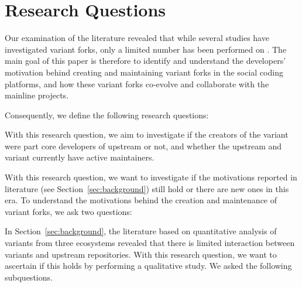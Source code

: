 \section{Research Questions}
\label{sec:rqs}

Our examination of the literature revealed that while several
studies have investigated variant forks, only a limited number has been performed on \gh.
The main goal of this paper is therefore to identify and understand the developers' motivation behind creating and maintaining variant forks in the \gh social coding platforms, and how these variant forks co-evolve and collaborate with the mainline projects.

Consequently, we define the following research questions:


\nd  \textbf{\rqOne} With this research question, we aim to investigate if the creators of the variant were part core developers of upstream or not, and whether the upstream and variant currently have active maintainers.

\nd  \emph{\rqOneOne}

\nd \emph{\rqOneTwo}

\nd \textbf{\rqTwo} With this research question, we want to investigate if the motivations reported in literature (see Section~\ref{sec:background}) still hold or there are new ones in this \gh era.
To understand the motivations behind the creation and maintenance of variant forks, we ask two questions:

\nd \textit{\rqTwoOne}

\nd  \textit{\rqTwoTwo}

\nd  \textit{\rqTwoThree}

\nd \textbf{\rqThree} In Section~\ref{sec:background}, the literature based on quantitative analysis of variants from three ecosystems revealed that there is limited interaction between variants and upstream repositories. With this research question, we want to ascertain if this holds by performing a qualitative study. We asked the following subquestions.

\nd \textit{\rqThreeOne}

\nd \textit{\rqThreeTwo}
